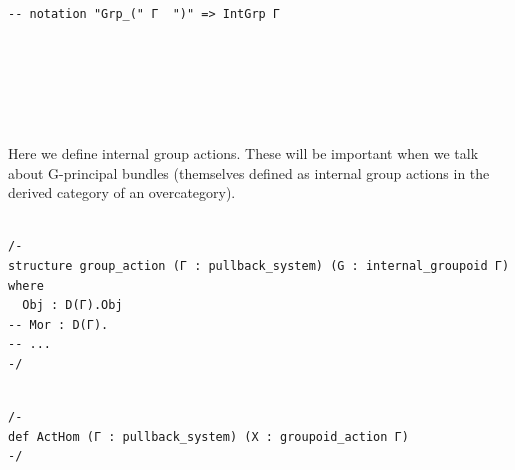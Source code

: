 \documentclass{book}
\theoremstyle{definition}
\newcounter{pcounter}
\newcounter{lcounter}
\newcounter{sectioncount}
\newcounter{subsectioncount}
\renewcommand{\section}[1]{\newpage\ \\ \ \\ \begin{center} \scalebox{1.5}{\texttt{\thesectioncount . #1}} \stepcounter{sectioncount} \setcounter{subsectioncount}{1} \end{center} \begin{center} \ \\ \ \\ \thispagestyle{empty} \end{center}}
\begin{document}
{{\begin{center}
\begin{tcolorbox}[width=5in,colback={white},title={\begin{center}\texttt{Lean \thelcounter} \addtocounter{lcounter}{1}  \end{center}},colbacktitle=Green,coltitle=black]
\begin{verbatim}
-- notation "Grp_(" Γ  ")" => IntGrp Γ

\end{verbatim}
\end{tcolorbox}
\end{center}

\section{\texttt{Act\_(Γ) G}}

Here we define internal group actions. These will be important when we talk about G-principal bundles (themselves defined as internal group actions in the derived category of an overcategory). 

\begin{center}
\begin{tcolorbox}[width=5in,colback={white},title={\begin{center}\texttt{Lean \thelcounter} \addtocounter{lcounter}{1}  \end{center}},colbacktitle=Blue,coltitle=black]
\begin{verbatim}

/-
structure group_action (Γ : pullback_system) (G : internal_groupoid Γ) where
  Obj : D(Γ).Obj
-- Mor : D(Γ).
-- ...
-/

\end{verbatim}
\end{tcolorbox}
\end{center}

\begin{center}
\begin{tcolorbox}[width=5in,colback={white},title={\begin{center}\texttt{Lean \thelcounter} \addtocounter{lcounter}{1}  \end{center}},colbacktitle=Blue,coltitle=black]
\begin{verbatim}

/-
def ActHom (Γ : pullback_system) (X : groupoid_action Γ)
-/

\end{verbatim}
\end{tcolorbox}
\end{center}

\begin{center}
\begin{tcolorbox}[width=5in,colback={white},title={\begin{center}\texttt{Lean \thelcounter} \addtocounter{lcounter}{1}  \end{center}},colbacktitle=Blue,coltitle=black]
\begin{verbatim}


\end{verbatim}
\end{tcolorbox}
\end{center}}}
\end{document}

